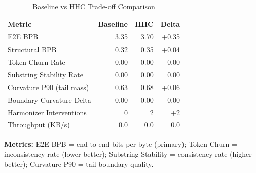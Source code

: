 
\begin{table}[htbp]
\centering
\caption{Baseline vs HHC Trade-off Comparison}
\label{tab:hhc-tradeoff}
\begin{tabular}{lrrr}
\toprule
Metric & Baseline & HHC & Delta \\
\midrule
E2E BPB & 3.35 & 3.70 & +0.35 \\
Structural BPB & 0.32 & 0.35 & +0.04 \\
Token Churn Rate & 0.00 & 0.00 & 0.00 \\
Substring Stability Rate & 0.00 & 0.00 & 0.00 \\
Curvature P90 (tail mass) & 0.63 & 0.68 & +0.06 \\
Boundary Curvature Delta & 0.00 & 0.00 & 0.00 \\
Harmonizer Interventions & 0 & 2 & +2 \\
Throughput (KB/s) & 0.0 & 0.0 & 0.0 \\
\bottomrule
\end{tabular}
\vspace{1em}
\begin{minipage}{0.9\textwidth}
\footnotesize
\textbf{Metrics:} E2E BPB = end-to-end bits per byte (primary); Token Churn = inconsistency rate (lower better); Substring Stability = consistency rate (higher better); Curvature P90 = tail boundary quality.
\end{minipage}
\end{table}